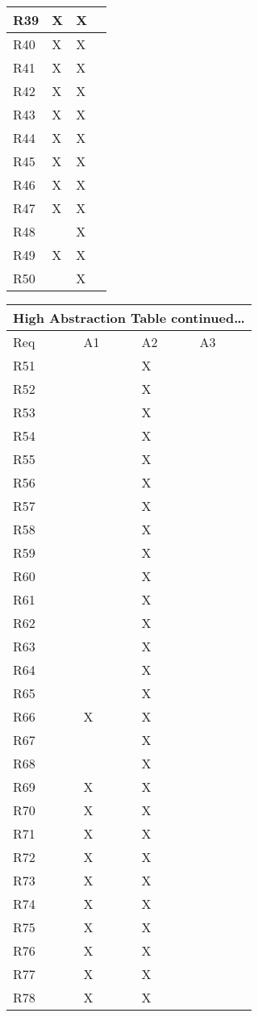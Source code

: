 \documentclass{article}
\begin{document}
\begin{tabular}{|l|l|l|l|}
R39 &X&X& \\\hline
R40 &X&X& \\\hline
R41 &X&X& \\\hline
R42 &X&X& \\\hline
R43 &X&X& \\\hline
R44 &X&X& \\\hline
R45 &X&X& \\\hline
R46 &X&X& \\\hline
R47 &X&X& \\\hline
R48 &&X& \\\hline
R49 &X&X& \\\hline
R50 &&X& \\\hline
\end{tabular}
\newpage
\begin{tabular}{|l|l|l|l|}
\hline
\multicolumn{4}{|c|}{High Abstraction Table continued\dots}\\\hline
Req& A1& A2&A3 \\\hline\hline
R51 &&X& \\\hline
R52 &&X& \\\hline
R53 &&X& \\\hline
R54 &&X& \\\hline
R55 &&X& \\\hline
R56 &&X& \\\hline
R57 &&X& \\\hline
R58 &&X& \\\hline
R59 &&X& \\\hline
R60 &&X& \\\hline
R61 &&X& \\\hline
R62 &&X& \\\hline
R63 &&X& \\\hline
R64 &&X& \\\hline
R65 &&X& \\\hline
R66 &X&X& \\\hline
R67 &&X& \\\hline
R68 &&X& \\\hline
R69 &X&X& \\\hline
R70 &X&X& \\\hline
R71 &X&X& \\\hline
R72 &X&X& \\\hline
R73 &X&X& \\\hline
R74 &X&X& \\\hline
R75 &X&X& \\\hline
R76 &X&X& \\\hline
R77 &X&X& \\\hline
R78 &X&X& \\\hline

\end{tabular}
\end{document}
